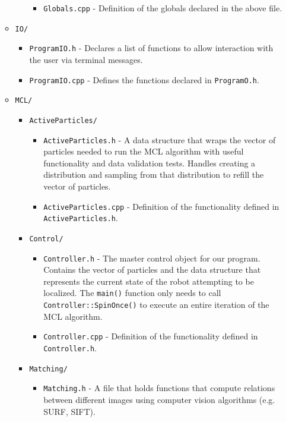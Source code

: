 \documentclass[a4paper,11pt]{article}
\begin{document}
\begin{itemize}
\begin{itemize}
\begin{itemize}
\begin{itemize}
	      \item \texttt{Globals.cpp} - Definition of the globals declared in the above file.
	    \end{itemize}
         \end{itemize}
      \item \texttt{IO/}
        \begin{itemize}
          \item \texttt{ProgramIO.h} - Declares a list of functions to allow interaction with the user via terminal messages. 
          \item \texttt{ProgramIO.cpp} - Defines the functions declared in \texttt{ProgramO.h}. 
        \end{itemize}
      \item \texttt{MCL/}
        \begin{itemize}
          \item \texttt{ActiveParticles/}
            \begin{itemize}
              \item \texttt{ActiveParticles.h} - A data structure that wraps the vector of particles needed to run the MCL algorithm with useful functionality and data validation tests. Handles creating a distribution and sampling from that distribution to refill the vector of particles.
              \item \texttt{ActiveParticles.cpp} - Definition of the functionality defined in \texttt{ActiveParticles.h}.
            \end{itemize}
          \item \texttt{Control/}
            \begin{itemize}
              \item \texttt{Controller.h} - The master control object for our program. Contains the vector of particles and the data structure that represents the current state of the robot attempting to be localized. The \texttt{main()} function only needs to call \texttt{Controller::SpinOnce()} to execute an entire iteration of the MCL algorithm.
              \item \texttt{Controller.cpp} - Definition of the functionality defined in \texttt{Controller.h}.
            \end{itemize}
          \item \texttt{Matching/}
            \begin{itemize}
              \item \texttt{Matching.h} - A file that holds functions that compute relations between different images using computer vision algorithms (e.g. SURF, SIFT).

\end{itemize}
\end{itemize}
\end{itemize}
\end{itemize}
\end{document}
